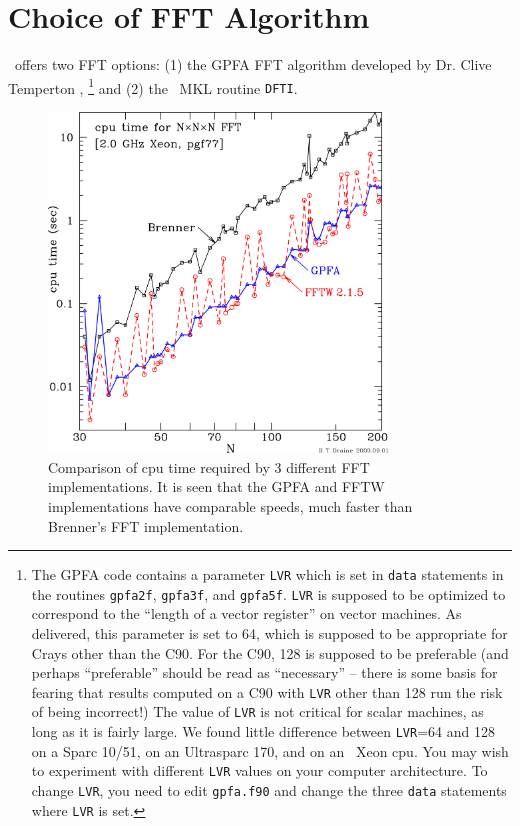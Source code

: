\section{Choice of FFT Algorithm\label{sec:choice_of_fft}}
\ddscatv\ offers two FFT options:
(1) the GPFA FFT algorithm developed by Dr. Clive Temperton 
\citep{Temperton_1992},
\footnote{The GPFA code contains a parameter {\tt LVR} which is set in 
          {\tt data} statements in the routines {\tt gpfa2f}, {\tt gpfa3f}, 
          and {\tt gpfa5f}.  {\tt LVR} is supposed to be optimized to 
          correspond to the ``length of a vector register'' on vector 
          machines.  As delivered, this parameter is set to 64, which is 
          supposed to be appropriate for Crays other than the C90.  
          For the C90, 128 is supposed to be preferable (and perhaps 
	  ``preferable'' should be read as
	  ``necessary'' -- there is some basis for fearing that results
	  computed on a C90 with {\tt LVR} other than 128 run the risk of being
	  incorrect!)
          The value of {\tt LVR} is not critical for scalar machines, as 
          long as it is fairly large.  We found little difference between 
          {\tt LVR}=64 and 128 on a Sparc 10/51, on an Ultrasparc 170, and 
          on an \Intel\ Xeon cpu.  You may wish to
          experiment with different {\tt LVR} values on your computer
          architecture.  To change {\tt LVR}, you need to edit {\tt gpfa.f90} 
          and change the three {\tt data} statements where {\tt LVR} is set.}
and (2) the \Intel\ MKL routine {\tt DFTI}. 

\begin{figure}[h]
\begin{center}
\vspace*{-0.9cm}
\includegraphics[width=9.0cm]{f5.png}
\vspace*{-2.2cm}
\caption{\label{fig:fft_timings}
        \footnotesize
	Comparison of cpu time required by 3 different FFT
	implementations.
	It is seen that the GPFA and FFTW implementations have comparable
	speeds, much faster than Brenner's FFT implementation.
	}
\end{center}
\end{figure}

